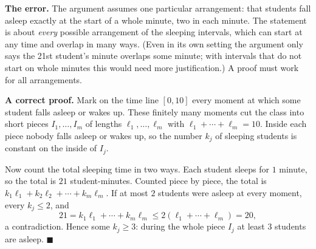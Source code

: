 \textbf{The error.} The argument assumes one particular arrangement: that students fall asleep exactly at the start of a whole minute, two in each minute. The statement is about \emph{every} possible arrangement of the sleeping intervals, which can start at any time and overlap in many ways. (Even in its own setting the argument only says the 21st student's minute overlaps some minute; with intervals that do not start on whole minutes this would need more justification.) A proof must work for all arrangements.

\textbf{A correct proof.} Mark on the time line $[0,10]$ every moment at which some student falls asleep or wakes up. These finitely many moments cut the class into short pieces $I_1,\dots,I_m$ of lengths $\ell_1,\dots,\ell_m$ with $\ell_1+\cdots+\ell_m=10$. Inside each piece nobody falls asleep or wakes up, so the number $k_j$ of sleeping students is constant on the inside of $I_j$.

Now count the total sleeping time in two ways. Each student sleeps for $1$ minute, so the total is $21$ student-minutes. Counted piece by piece, the total is $k_1\ell_1+k_2\ell_2+\cdots+k_m\ell_m$. If at most $2$ students were asleep at every moment, every $k_j\le2$, and
\[
21=k_1\ell_1+\cdots+k_m\ell_m\le2(\ell_1+\cdots+\ell_m)=20,
\]
a contradiction. Hence some $k_j\ge3$: during the whole piece $I_j$ at least $3$ students are asleep. $\blacksquare$
